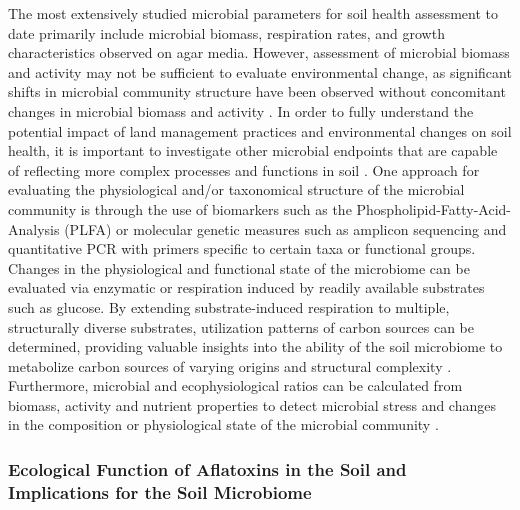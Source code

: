 The most extensively studied microbial parameters for soil health assessment to date primarily include microbial biomass, respiration rates, and growth characteristics observed on agar media. However, assessment of microbial biomass and activity may not be sufficient to evaluate environmental change, as significant shifts in microbial community structure have been observed without concomitant changes in microbial biomass and activity \citep{joergensen2006methods, fliessbach2004short}. In order to fully understand the potential impact of land management practices and environmental changes on soil health, it is important to investigate other microbial endpoints that are capable of reflecting more complex processes and functions in soil \citep{joergensen2006methods}. One approach for evaluating the physiological and/or taxonomical structure of the microbial community is through the use of biomarkers such as the Phospholipid-Fatty-Acid-Analysis (PLFA) or molecular genetic measures such as amplicon sequencing and quantitative PCR with primers specific to certain taxa or functional groups. Changes in the physiological and functional state of the microbiome can be evaluated via enzymatic or respiration induced by readily available substrates such as glucose. By extending substrate-induced respiration to multiple, structurally diverse substrates, utilization patterns of carbon sources can be determined, providing valuable insights into the ability of the soil microbiome to metabolize carbon sources of varying origins and structural complexity \citep{campbell2003rapid, chapman2007assessing}. Furthermore, microbial and ecophysiological ratios can be calculated from biomass, activity and nutrient properties to detect microbial stress and changes in the composition or physiological state of the microbial community \citep{joergensen2006methods, blagodatskaya2013active}.

\subsubsection*{Ecological Function of Aflatoxins in the Soil and Implications for the Soil Microbiome} \label{subsubchap:soilhealth_threat} 

